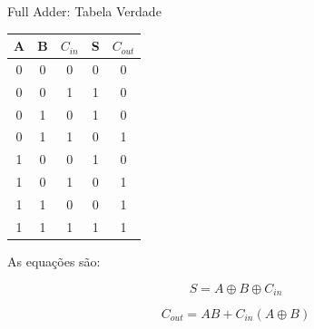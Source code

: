 \begin{frame}{Full Adder: Tabela Verdade}

    \small

    \begin{center}
        \begin{tabular}{c c c | c c}
            \hline
            A & B & $C_{in}$ & S & $C_{out}$ \\
            \hline
            0 & 0 & 0 & 0 & 0 \\
            0 & 0 & 1 & 1 & 0 \\
            0 & 1 & 0 & 1 & 0 \\
            0 & 1 & 1 & 0 & 1 \\
            1 & 0 & 0 & 1 & 0 \\
            1 & 0 & 1 & 0 & 1 \\
            1 & 1 & 0 & 0 & 1 \\
            1 & 1 & 1 & 1 & 1 \\
            \hline
        \end{tabular}
    \end{center}

    \vspace{0.3cm}

    As equações são:

    \[
        \boxed{S=A\oplus B\oplus C_{in}}
    \]

    \[
        \boxed{C_{out}=AB+C_{in}(A\oplus B)}
    \]

\end{frame}